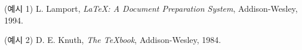 \renewcommand{\bibname}{참고문헌}        %
\begin{thebibliography}{99} %

    (예시 1) L. Lamport, \textit{LaTeX: A Document Preparation System}, Addison-Wesley, 1994.
    
    (예시 2) D. E. Knuth, \textit{The TeXbook}, Addison-Wesley, 1984.
    

\end{thebibliography}